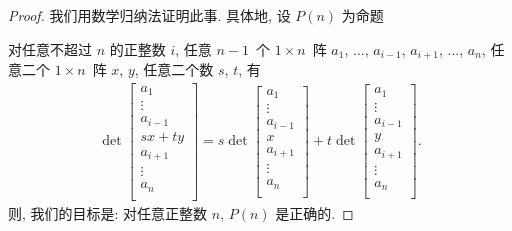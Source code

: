 \documentclass[%
    UTF8,%
    fontset=none,%
    punct=kaiming,%
    zihao=-4,%
    a4paper,%
    oneside,%
]{ctexbook}
\makeatletter
\renewenvironment{quotation}
{\list{}{\listparindent 2\ccwd%
\itemindent\listparindent
\leftmargin\rightmargin
\parsep\z@ \@plus\p@}%
\item\relax}
{\endlist}
\makeatother
\begin{document}
\begin{proof}
    我们用数学归纳法证明此事.
    具体地, 设 \(P(n)\) 为命题
    \begin{quotation}
        对任意不超过 \(n\) 的正整数 \(i\),
        任意 \(n-1\)~个 \(1 \times n\)~阵
        \(a_1\), \(\dots\), \(a_{i-1}\),
        \(a_{i+1}\), \(\dots\), \(a_n\),
        任意二个 \(1 \times n\)~阵 \(x\), \(y\),
        任意二个数 \(s\), \(t\),
        有
        \begin{align*}
            \det
            {\begin{bmatrix}
                     a_1     \\
                     \vdots  \\
                     a_{i-1} \\
                     sx + ty \\
                     a_{i+1} \\
                     \vdots  \\
                     a_{n}   \\
                 \end{bmatrix}}
            =
            s
            \det
            {\begin{bmatrix}
                     a_1     \\
                     \vdots  \\
                     a_{i-1} \\
                     x       \\
                     a_{i+1} \\
                     \vdots  \\
                     a_{n}   \\
                 \end{bmatrix}}
            +
            t
            \det
            {\begin{bmatrix}
                     a_1     \\
                     \vdots  \\
                     a_{i-1} \\
                     y       \\
                     a_{i+1} \\
                     \vdots  \\
                     a_{n}   \\
                 \end{bmatrix}}.
        \end{align*}
    \end{quotation}
    则, 我们的目标是:
    对任意正整数 \(n\), \(P(n)\) 是正确的.


\end{proof}
\end{document}
